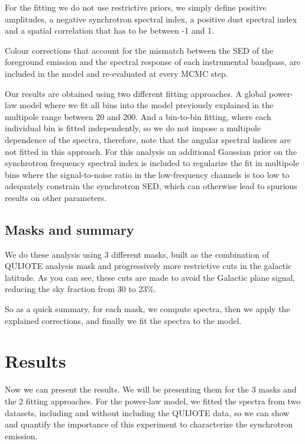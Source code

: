 \documentclass[12pt,a4paper]{article}
\begin{document}
For the fitting we do not use restrictive priors, we simply define positive amplitudes, a negative synchrotron spectral index, a positive dust spectral index and a spatial correlation that has to be between -1 and 1.

Colour corrections that account for the mismatch between the SED of the foreground emission and the spectral response of each instrumental bandpass, are included in the model and re-evaluated at every MCMC step.

Our results are obtained using two different fitting approaches. A global power-law model where we fit all bins into the model previously explained in the multipole range between 20 and 200. And a bin-to-bin fitting, where each individual bin is fitted independently, so we do not impose a multipole dependence of the spectra, therefore, note that the angular spectral indices are not fitted in this approach. For this analysis an additional Gaussian prior on the synchrotron frequency spectral index is included to regularize the fit in multipole bins where the signal-to-noise ratio in the low-frequency channels is too low to adequately constrain the synchrotron SED, which can otherwise lead to spurious results on other parameters.

\subsection{Masks and summary}

We do these analysis using 3 different masks, built as the combination of QUIJOTE analysis mask and progressively more restrictive cuts in the galactic latitude. As you can see, these cuts are made to avoid the Galactic plane signal, reducing the sky fraction from 30 to 23\%. 

So as a quick summary, for each mask, we compute spectra, then we apply the explained corrections, and finally we fit the spectra to the model.


\section{Results}

Now we can present the results. We will be presenting them for the 3 masks and the 2 fitting approaches. For the power-law model, we fitted the spectra from two datasets, including and without including the QUIJOTE data, so we can show and quantify the importance of this experiment to characterize the synchrotron emission.
\end{document}
